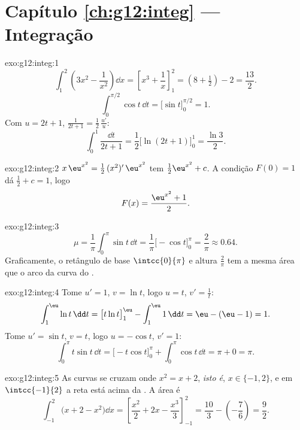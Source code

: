 \section*{Capítulo \ref{ch:g12:integ} --- Integração}

\begin{solution}{exo:g12:integ:1}
\[
\int_1^2 \left(3x^2 - \frac{1}{x^2}\right)\dd x
= \left[x^3 + \frac1x\right]_1^2 = \left(8 + \tfrac12\right) - 2 = \frac{13}{2}.
\]
\[
\int_0^{\pi/2} \cos t\,\dd t = \bigl[\sin t\bigr]_0^{\pi/2} = 1 .
\]
Com $u = 2t+1$, $\frac{1}{2t+1} = \frac12\,\frac{u'}{u}$:
\[
\int_0^1 \frac{\dd t}{2t+1} = \frac12\bigl[\ln(2t+1)\bigr]_0^1
= \frac{\ln 3}{2}.
\]
\end{solution}

\begin{solution}{exo:g12:integ:2}
$x\,\eu^{x^2} = \frac12\,(x^2)'\,\eu^{x^2}$ tem 
$\frac12\eu^{x^2} + c$. A condição $F(0) = 1$ dá $\frac12 + c = 1$, logo
\[
F(x) = \frac{\eu^{x^2} + 1}{2}.
\]
\end{solution}

\begin{solution}{exo:g12:integ:3}
\[
\mu = \frac{1}{\pi}\int_0^\pi \sin t\,\dd t
= \frac{1}{\pi}\bigl[-\cos t\bigr]_0^\pi = \frac{2}{\pi} \approx 0.64 .
\]
Graficamente, o retângulo de base $\intcc{0}{\pi}$ e altura
$\frac{2}{\pi}$ tem a mesma área que o arco da curva do .
\end{solution}

\begin{solution}{exo:g12:integ:4}
Tome $u' = 1$, $v = \ln t$, logo $u = t$, $v' = \frac1t$:
\[
\int_1^{\eu} \ln t\,\dd t = \bigl[t\ln t\bigr]_1^{\eu} - \int_1^{\eu} 1\,\dd t
= \eu - (\eu - 1) = 1 .
\]
Tome $u' = \sin t$, $v = t$, logo $u = -\cos t$, $v' = 1$:
\[
\int_0^\pi t\sin t\,\dd t = \bigl[-t\cos t\bigr]_0^\pi + \int_0^\pi \cos t\,\dd t
= \pi + 0 = \pi .
\]
\end{solution}

\begin{solution}{exo:g12:integ:5}
As curvas se cruzam onde $x^2 = x + 2$, \emph{isto é},
$x \in \{-1, 2\}$, e em $\intcc{-1}{2}$ a reta está acima da . A
área é
\[
\int_{-1}^{2} \bigl(x + 2 - x^2\bigr)\dd x
= \left[\frac{x^2}{2} + 2x - \frac{x^3}{3}\right]_{-1}^{2}
= \frac{10}{3} - \left(-\frac{7}{6}\right) = \frac{9}{2}.
\]
\end{solution}


